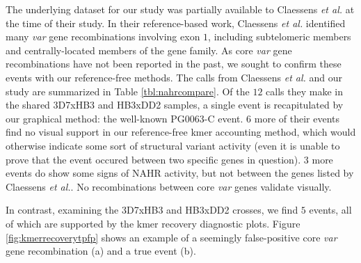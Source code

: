 The underlying dataset for our study was partially available to Claessens \textit{et al.} at the time of their study.  In their reference-based work, Claessens \textit{et al.} identified many \textit{var} gene recombinations involving exon $1$, including subtelomeric members and centrally-located members of the gene family.  As core \textit{var} gene recombinations have not been reported in the past, we sought to confirm these events with our reference-free methods.  The calls from Claessens \textit{et al.} and our study are summarized in Table \ref{tbl:nahrcompare}.  Of the $12$ calls they make in the shared 3D7xHB3 and HB3xDD2 samples, a single event is recapitulated by our graphical method: the well-known PG0063-C event.  $6$ more of their events find no visual support in our reference-free kmer accounting method, which would otherwise indicate some sort of structural variant activity (even it is unable to prove that the event occured between two specific genes in question).  $3$ more events do show some signs of NAHR activity, but not between the genes listed by Claessens \textit{et al.}.  No recombinations between core \textit{var} genes validate visually.

In contrast, examining the 3D7xHB3 and HB3xDD2 crosses, we find $5$ events, all of which are supported by the kmer recovery diagnostic plots.  Figure \ref{fig:kmerrecoverytpfp} shows an example of a seemingly false-positive core \textit{var} gene recombination (a) and a true event (b).

